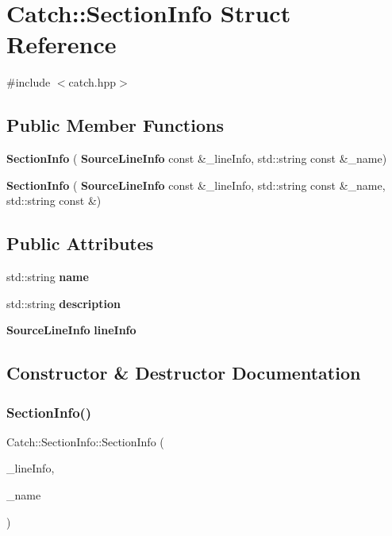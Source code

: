 \section{Catch\+::Section\+Info Struct Reference}
\label{struct_catch_1_1_section_info}


{\ttfamily \#include $<$catch.\+hpp$>$}

\subsection*{Public Member Functions}
\begin{DoxyCompactItemize}
\item 
\textbf{ Section\+Info} (\textbf{ Source\+Line\+Info} const \&\+\_\+line\+Info, std\+::string const \&\+\_\+name)
\item 
\textbf{ Section\+Info} (\textbf{ Source\+Line\+Info} const \&\+\_\+line\+Info, std\+::string const \&\+\_\+name, std\+::string const \&)
\end{DoxyCompactItemize}
\subsection*{Public Attributes}
\begin{DoxyCompactItemize}
\item 
std\+::string \textbf{ name}
\item 
std\+::string \textbf{ description}
\item 
\textbf{ Source\+Line\+Info} \textbf{ line\+Info}
\end{DoxyCompactItemize}


\subsection{Constructor \& Destructor Documentation}
\mbox{\label{struct_catch_1_1_section_info_a2808437ae7d4bc0830cee1c3995165a6}} 
\subsubsection{SectionInfo()\hspace{0.1cm}{\footnotesize\ttfamily [1/2]}}
{\footnotesize\ttfamily Catch\+::\+Section\+Info\+::\+Section\+Info (\begin{DoxyParamCaption}\item[{\textbf{ Source\+Line\+Info} const \&}]{\+\_\+line\+Info,  }\item[{std\+::string const \&}]{\+\_\+name }\end{DoxyParamCaption})}

